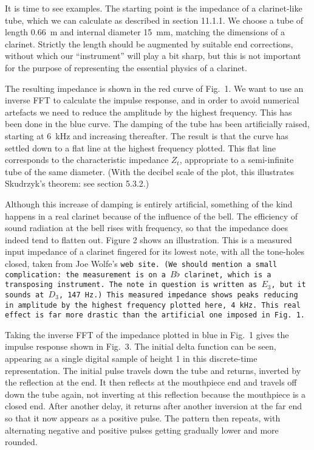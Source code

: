  It is time to see examples. The starting point is the impedance of a 
  clarinet-like tube, which we can calculate as described in section 11.1.1. We 
  choose a tube of length 0.66~m and internal diameter 15~mm, matching the 
  dimensions of a clarinet. Strictly the length should be augmented by suitable 
  end corrections, without which our ``instrument'' will play a bit sharp, but 
  this is not important for the purpose of representing the essential physics 
  of a clarinet. 

  The resulting impedance is shown in the red curve of Fig.\ 1. We want to use 
  an inverse FFT to calculate the impulse response, and in order to avoid 
  numerical artefacts we need to reduce the amplitude by the highest frequency. 
  This has been done in the blue curve. The damping of the tube has been 
  artificially raised, starting at 6~kHz and increasing thereafter. The result 
  is that the curve has settled down to a flat line at the highest frequency 
  plotted. This flat line corresponds to the characteristic impedance $Z_t$, 
  appropriate to a semi-infinite tube of the same diameter. (With the decibel 
  scale of the plot, this illustrates Skudrzyk's theorem: see section 5.3.2.) 

  Although this increase of damping is entirely artificial, something of the 
  kind happens in a real clarinet because of the influence of the bell. The 
  efficiency of sound radiation at the bell rises with frequency, so that the 
  impedance does indeed tend to flatten out. Figure 2 shows an illustration. 
  This is a measured input impedance of a clarinet fingered for its lowest 
  note, with all the tone-holes closed, taken from Joe Wolfe's \tt{}web 
  site\rm{}. (We should mention a small complication: the measurement is on a 
  $B\flat$ clarinet, which is a transposing instrument. The note in question is 
  written as $E_3$, but it sounds at $D_3$, 147~Hz.) This measured impedance 
  shows peaks reducing in amplitude by the highest frequency plotted here, 4 
  kHz. This real effect is far more drastic than the artificial one imposed in 
  Fig.\ 1. 

  Taking the inverse FFT of the impedance plotted in blue in Fig.\ 1 gives the 
  impulse response shown in Fig.\ 3. The initial delta function can be seen, 
  appearing as a single digital sample of height 1 in this discrete-time 
  representation. The initial pulse travels down the tube and returns, inverted 
  by the reflection at the end. It then reflects at the mouthpiece end and 
  travels off down the tube again, not inverting at this reflection because the 
  mouthpiece is a closed end. After another delay, it returns after another 
  inversion at the far end so that it now appears as a positive pulse. The 
  pattern then repeats, with alternating negative and positive pulses getting 
  gradually lower and more rounded. 

